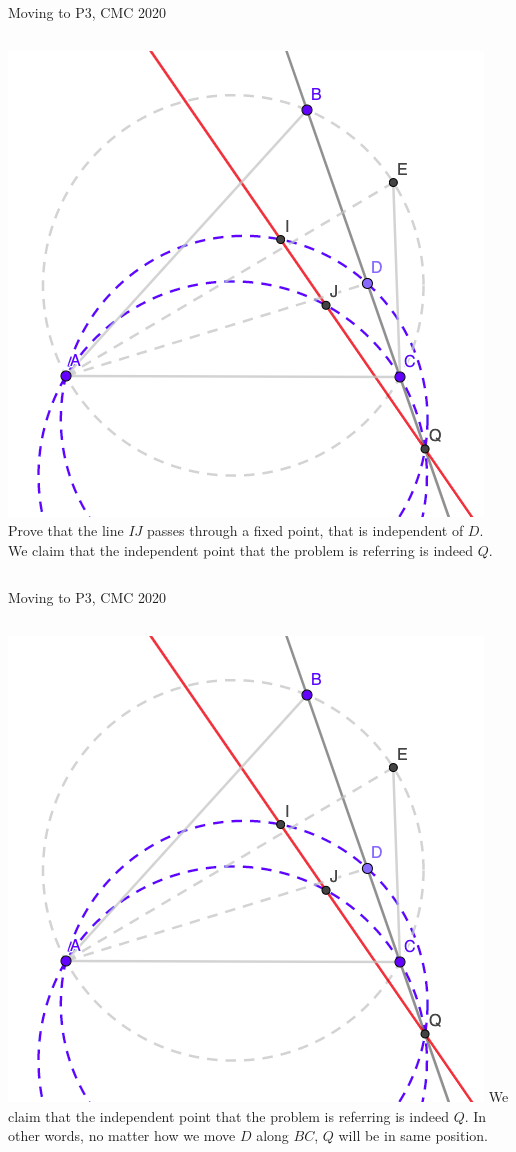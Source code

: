 \documentclass{beamer}
\begin{document}
\begin{frame}{Moving to P3, CMC 2020}
	\begin{columns}
		\includegraphics[scale=0.34]{spi11.png}
		Prove that the line $IJ$ passes through a fixed
		point, that is independent of $D$.\\
		\phantom{Spacing}
		We claim that the independent point that the problem is
		referring is indeed $Q$.
	\end{columns}
\end{frame}
\begin{frame}{Moving to P3, CMC 2020}
	\begin{columns}
		\column{0.6\textwidth}
		\includegraphics[scale=0.34]{spi11.png}
		\column{0.4\textwidth}
		We claim that the independent point that the problem is
		referring is indeed $Q$. In other words, no matter
		how we move $D$ along $BC$, $Q$ will be in same position.
	\end{columns}
\end{frame}
\end{document}
